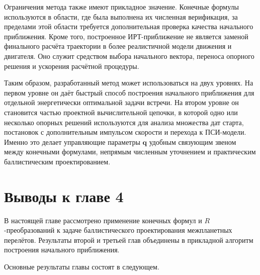 Ограничения метода также имеют прикладное значение. Конечные формулы используются в области, где была выполнена их численная верификация, за пределами этой области требуется дополнительная проверка качества начального приближения. Кроме того, построенное ИРТ-приближение не является заменой финального расчёта траектории в более реалистичной модели движения и двигателя. Оно служит средством выбора начального вектора, переноса опорного решения и ускорения расчётной процедуры.

Таким образом, разработанный метод может использоваться на двух уровнях. На первом уровне он даёт быстрый способ построения начального приближения для отдельной энергетически оптимальной задачи встречи. На втором уровне он становится частью проектной вычислительной цепочки, в которой одно или несколько опорных решений используются для анализа множества дат старта, постановок с дополнительным импульсом скорости и перехода к ПСИ-модели. Именно это делает управляющие параметры \(\mathbf q\) удобным связующим звеном между конечными формулами, непрямым численным уточнением и практическим баллистическим проектированием.

\section{Выводы к главе 4}

В настоящей главе рассмотрено применение конечных формул и \(R\)-преобразований к задаче баллистического проектирования межпланетных перелётов. Результаты второй и третьей глав объединены в прикладной алгоритм построения начального приближения.

Основные результаты главы состоят в следующем.

